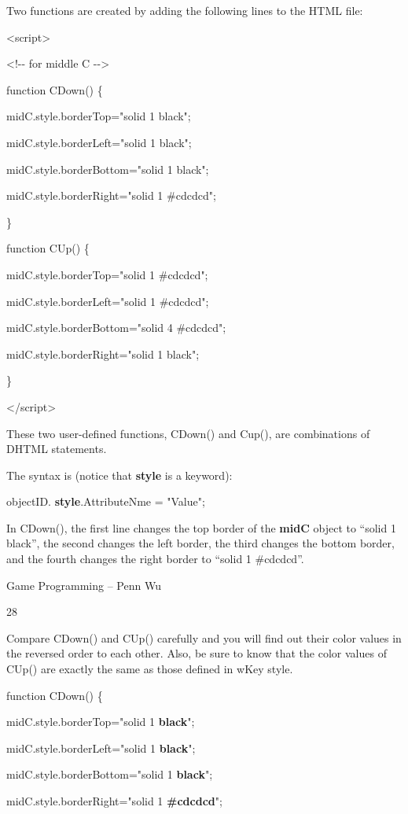 \documentclass[
]{article}
\begin{document}
Two functions are created by adding the following lines to the HTML
file:

\textless script\textgreater{}

\textless!-\/- for middle C -\/-\textgreater{}

function CDown() \{

midC.style.borderTop="solid 1 black";

midC.style.borderLeft="solid 1 black";

midC.style.borderBottom="solid 1 black";

midC.style.borderRight="solid 1 \#cdcdcd";

\}

function CUp() \{

midC.style.borderTop="solid 1 \#cdcdcd";

midC.style.borderLeft="solid 1 \#cdcdcd";

midC.style.borderBottom="solid 4 \#cdcdcd";

midC.style.borderRight="solid 1 black";

\}

\textless/script\textgreater{}

These two user-defined functions, CDown() and Cup(), are combinations of
DHTML statements.

The syntax is (notice that \textbf{style} is a keyword):

objectID. \textbf{style}.AttributeNme = "Value";

In CDown(), the first line changes the top border of the \textbf{midC}
object to ``solid 1 black'', the second changes the left border, the
third changes the bottom border, and the fourth changes the right border
to ``solid 1 \#cdcdcd''.

Game Programming -- Penn Wu

28

\protect\hypertarget{index_split_003.htmlux5cux23p29}{}{}Compare CDown()
and CUp() carefully and you will find out their color values in the
reversed order to each other. Also, be sure to know that the color
values of CUp() are exactly the same as those defined in wKey style.

function CDown() \{

midC.style.borderTop="solid 1 \textbf{black}";

midC.style.borderLeft="solid 1 \textbf{black}";

midC.style.borderBottom="solid 1 \textbf{black}";

midC.style.borderRight="solid 1 \textbf{\#cdcdcd}";
\end{document}
